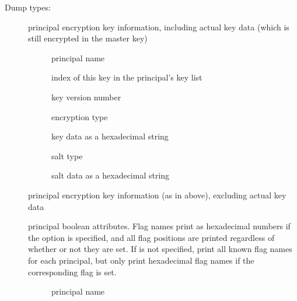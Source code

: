 \documentclass[letterpaper,10pt,english]{sphinxmanual}
\begin{document}
\sphinxAtStartPar
Dump types:
\begin{description}
\item[{}] \leavevmode
\sphinxAtStartPar
principal encryption key information, including actual key data
(which is still encrypted in the master key)
\begin{description}
\item[{}] \leavevmode
\sphinxAtStartPar
principal name

\item[{}] \leavevmode
\sphinxAtStartPar
index of this key in the principal’s key list

\item[{}] \leavevmode
\sphinxAtStartPar
key version number

\item[{}] \leavevmode
\sphinxAtStartPar
encryption type

\item[{}] \leavevmode
\sphinxAtStartPar
key data as a hexadecimal string

\item[{}] \leavevmode
\sphinxAtStartPar
salt type

\item[{}] \leavevmode
\sphinxAtStartPar
salt data as a hexadecimal string

\end{description}

\item[{}] \leavevmode
\sphinxAtStartPar
principal encryption key information (as in  above),
excluding actual key data

\item[{}] \leavevmode
\sphinxAtStartPar
principal boolean attributes.  Flag names print as hexadecimal
numbers if the  option is specified, and all flag positions
are printed regardless of whether or not they are set.  If 
is not specified, print all known flag names for each principal,
but only print hexadecimal flag names if the corresponding flag is
set.
\begin{description}
\item[{}] \leavevmode
\sphinxAtStartPar
principal name


\end{description}
\end{description}
\end{document}
